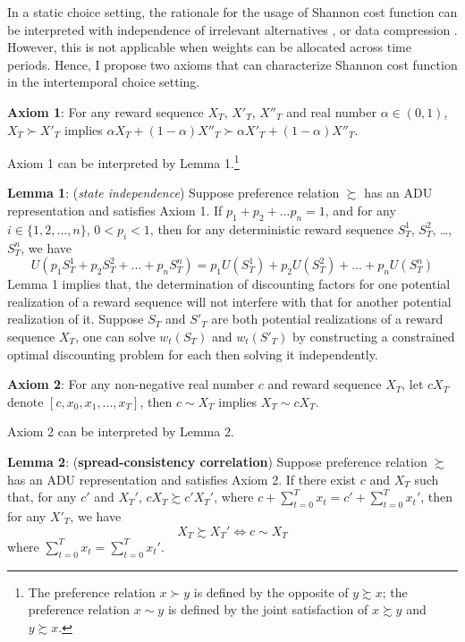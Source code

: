 \documentclass[
  12pt,
]{article}
\begin{document}
In a static choice setting, the rationale for the usage of Shannon cost
function can be interpreted with independence of irrelevant alternatives
\citep{matejka_rational_2015}, or data compression
\citep{caplin_rationally_2022}. However, this is not applicable when
weights can be allocated across time periods. Hence, I propose two
axioms that can characterize Shannon cost function in the intertemporal
choice setting.

\textbf{Axiom 1}: For any reward sequence \(X_T\), \(X'_T\), \(X''_T\)
and real number \(\alpha\in(0,1)\), \(X_T\succ X'_T\) implies
\(\alpha X_T+ (1-\alpha)X''_T \succ \alpha X'_T + (1-\alpha) X''_T\).

Axiom 1 can be interpreted by Lemma 1.\footnote{The preference relation
  \(x \succ y\) is defined by the opposite of \(y\succsim x\); the
  preference relation \(x\sim y\) is defined by the joint satisfaction
  of \(x\succsim y\) and \(y \succsim x\).}

\textbf{Lemma 1}: (\emph{state independence}) Suppose preference
relation \(\succsim\) has an ADU representation and satisfies Axiom 1.
If \(p_1+p_2+...p_n=1\), and for any \(i\in\{1,2,…,n\}\), \(0<p_i<1\),
then for any deterministic reward sequence \(S^1_T\), \(S^2_T\), \ldots,
\(S^n_T\), we have\[
U(p_1 S^1_T+p_2S^2_T+...+p_nS^n_T)=p_1U(S^1_T)+p_2U(S^2_T)+...+p_nU(S^n_T)
\]Lemma 1 implies that, the determination of discounting factors for one
potential realization of a reward sequence will not interfere with that
for another potential realization of it. Suppose \(S_T\) and \(S'_{T}\)
are both potential realizations of a reward sequence \(X_T\), one can
solve \(w_t(S_T)\) and \(w_t(S'_T)\) by constructing a constrained
optimal discounting problem for each then solving it independently.

\textbf{Axiom 2}: For any non-negative real number \(c\) and reward
sequence \(X_T\), let \(cX_T\) denote \([c,x_0,x_1,...,x_T]\), then
\(c\sim X_T\) implies \(X_T \sim cX_T\).

Axiom 2 can be interpreted by Lemma 2.

\textbf{Lemma 2}: (\textbf{spread-consistency correlation}) Suppose
preference relation \(\succsim\) has an ADU representation and satisfies
Axiom 2. If there exist \(c\) and \(X_T\) such that, for any \(c'\) and
\(X_T'\), \(cX_T\succsim c'X_T'\), where
\(c+\sum_{t=0}^Tx_t=c'+\sum_{t=0}^Tx_t'\), then for any \(X'_T\), we
have \[X_T \succsim X_T' \Longleftrightarrow c\sim X_T\]where
\(\sum_{t=0}^Tx_t=\sum_{t=0}^Tx_t'\).
\end{document}
